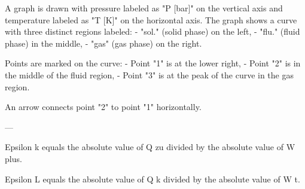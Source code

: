 A graph is drawn with pressure labeled as "P [bar]" on the vertical axis and temperature labeled as "T [K]" on the horizontal axis. The graph shows a curve with three distinct regions labeled:  
- "sol." (solid phase) on the left,  
- "flu." (fluid phase) in the middle,  
- "gas" (gas phase) on the right.  

Points are marked on the curve:  
- Point "1" is at the lower right,  
- Point "2" is in the middle of the fluid region,  
- Point "3" is at the peak of the curve in the gas region.  

An arrow connects point "2" to point "1" horizontally.  

---

Epsilon k equals the absolute value of Q zu divided by the absolute value of W plus.  

Epsilon L equals the absolute value of Q k divided by the absolute value of W t.